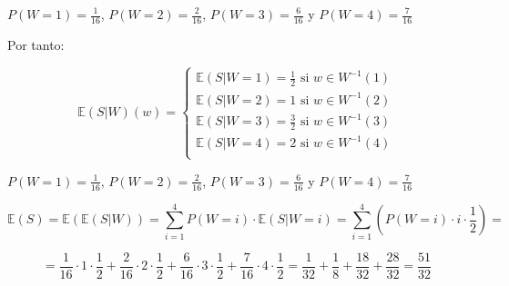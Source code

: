 \begin{problem}[4]
$P(W=1)=\frac{1}{16}$, $P(W=2)=\frac{2}{16}$, $P(W=3)=\frac{6}{16}$ y $P(W=4)=\frac{7}{16}$

Por tanto:

$$
\mathbb{E}(S|W)(w) =
  \left\lbrace
  \begin{array}{l}
     \mathbb{E}(S|W=1) = \frac{1}{2} \text{ si } w \in W^{-1}(1) \\
     \mathbb{E}(S|W=2) = 1 \text{ si } w \in W^{-1}(2) \\
     \mathbb{E}(S|W=3) = \frac{3}{2} \text{ si } w \in W^{-1}(3) \\
     \mathbb{E}(S|W=4) = 2 \text{ si } w \in W^{-1}(4) \\
  \end{array}
  \right.
$$









\spart
$P(W=1)=\frac{1}{16}$, $P(W=2)=\frac{2}{16}$, $P(W=3)=\frac{6}{16}$ y $P(W=4)=\frac{7}{16}$


\[
\mathbb{E}(S)=\mathbb{E}(\mathbb{E}(S|W))=\sum_{i=1}^{4}P(W=i)\cdot\mathbb{E}(S|W=i)=\sum_{i=1}^{4}\left( P(W=i)\cdot i \cdot \frac{1}{2}\right)= 
\]

\[
=\frac{1}{16}\cdot1\cdot\frac{1}{2}+\frac{2}{16}\cdot2\cdot\frac{1}{2}+\frac{6}{16}\cdot3\cdot\frac{1}{2}+\frac{7}{16}\cdot4\cdot\frac{1}{2}=\frac{1}{32}+\frac{1}{8}+\frac{18}{32}+\frac{28}{32}=\frac{51}{32}
\]
\end{problem}

